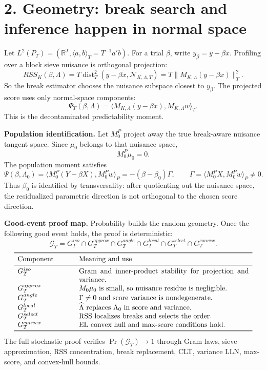\documentclass[11pt]{article}
\newcommand{\innerT}[2]{\langle #1,#2\rangle_T}
\newcommand{\innerP}[2]{\langle #1,#2\rangle_P}
\newcommand{\N}{\mathcal N}
\begin{document}
\newpage
\section*{2. Geometry: break search and inference happen in normal space}

Let \(L^2(P_T)=(\mathbb R^T,\innerT{a}{b}=T^{-1}a'b)\). For a trial
\(\beta\), write \(y_\beta=y-\beta x\). Profiling over a block sieve nuisance
is orthogonal projection:
\[
    RSS_K(\beta,\Lambda)
    =
    T\operatorname{dist}_T^2(y-\beta x,\N_{K,\Lambda,T})
    =
    T\|M_{K,\Lambda}(y-\beta x)\|_T^2 .
\]
So the break estimator chooses the nuisance subspace closest to \(y_\beta\).
The projected score uses only normal-space components:
\[
    \Psi_T(\beta,\Lambda)
    =
    \innerT{M_{K,\Lambda}(y-\beta x)}
            {M_{K,\Lambda}w}.
\]
This is the decontaminated predictability moment.

\textbf{Population identification.} Let \(M_0^P\) project away the true
break-aware nuisance tangent space. Since \(\mu_0\) belongs to that nuisance
space,
\[
    M_0^P\mu_0=0 .
\]
The population moment satisfies
\[
    \Psi(\beta,\Lambda_0)
    =
    \innerP{M_0^P(Y-\beta X)}{M_0^Pw}
    =
    -(\beta-\beta_0)\Gamma,
    \qquad
    \Gamma=\innerP{M_0^PX}{M_0^Pw}\neq0.
\]
Thus \(\beta_0\) is identified by transversality: after quotienting out the
nuisance space, the residualized parametric direction is not orthogonal to the
chosen score direction.

\textbf{Good-event proof map.} Probability builds the random geometry. Once the
following good event holds, the proof is deterministic:
\[
    \mathcal G_T
    =
    G_T^{iso}\cap G_T^{approx}\cap G_T^{angle}
    \cap G_T^{local}\cap G_T^{select}\cap G_T^{convex}.
\]
\[
\begin{array}{p{0.22\linewidth}p{0.69\linewidth}}
\toprule
Component & Meaning and use\\
\midrule
\(G_T^{iso}\) & Gram and inner-product stability for projection and variance.\\
\(G_T^{approx}\) & \(M_0\mu_0\) is small, so nuisance residue is negligible.\\
\(G_T^{angle}\) & \(\Gamma\neq0\) and score variance is nondegenerate.\\
\(G_T^{local}\) & \(\widehat\Lambda\) replaces \(\Lambda_0\) in score and variance.\\
\(G_T^{select}\) & RSS localizes breaks and selects the order.\\
\(G_T^{convex}\) & EL convex hull and max-score conditions hold.\\
\bottomrule
\end{array}
\]
The full stochastic proof verifies \(\Pr(\mathcal G_T)\to1\) through Gram
laws, sieve approximation, RSS concentration, break replacement, CLT, variance
LLN, max-score, and convex-hull bounds.
\end{document}
